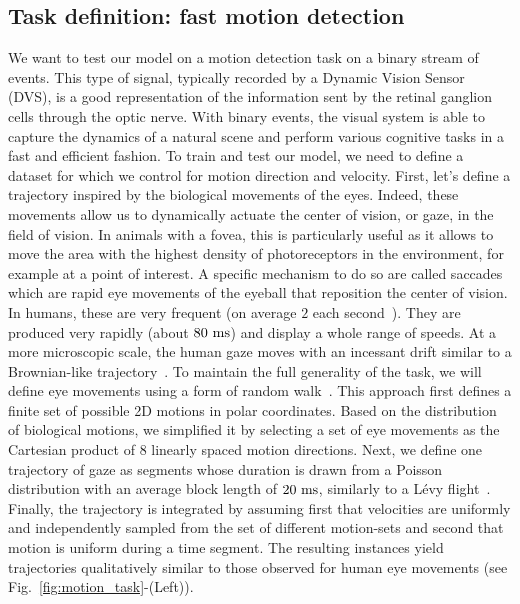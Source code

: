 \documentclass[default]{sn-jnl}%
\theoremstyle{thmstyleone}%
\theoremstyle{thmstyletwo}%
\theoremstyle{thmstylethree}%
\newcommand{\seeFig}[1]{see Fig.~\ref{fig:#1}}%
\begin{document}
\subsection{Task definition: fast motion detection}
We want to test our model on a motion detection task on a binary stream of events. This type of signal, typically recorded by a Dynamic Vision Sensor (DVS), is a good representation of the information sent by the retinal ganglion cells through the optic nerve. With binary events, the visual system is able to capture the dynamics of a natural scene and perform various cognitive tasks in a fast and efficient fashion. To train and test our model, we need to define a dataset for which we control for motion direction and velocity. 
First, let's define a trajectory inspired by the biological movements of the eyes. Indeed, these movements allow us to dynamically actuate the center of vision, or gaze, in the field of vision. In animals with a fovea, this is particularly useful as it allows to move the area with the highest density of photoreceptors in the environment, for example at a point of interest. A specific mechanism to do so are called saccades which are rapid eye movements of the eyeball that reposition the center of vision. In humans, these are very frequent (on average $2$ each second~\citep{dandekar_neural_2012}). They are produced very rapidly (about $80~\si{\milli\second}$) and display a whole range of speeds. At a more microscopic scale, the human gaze moves with an incessant drift similar to a Brownian-like trajectory~\citep{poletti_head-eye_2015}. To maintain the full generality of the task, we will define eye movements using a form of random walk~\citep{engbert_integrated_2011}. This approach first defines a finite set of possible 2D motions in polar coordinates. Based on the distribution of biological motions, we simplified it by selecting a set of eye movements as the Cartesian product of %
$8$ linearly spaced motion directions. Next, we define one trajectory of gaze as segments whose duration is drawn from a Poisson distribution with an average block length of $20~\si{\milli\second}$, similarly to a Lévy flight~\citep[p. 289]{mandelbrot_fractal_1982}. Finally, the trajectory is integrated by assuming first that velocities are uniformly and independently sampled from the set of different motion-sets and second that motion is uniform during a time segment. The resulting instances yield trajectories qualitatively similar to those observed for human eye movements (\seeFig{motion_task}-(Left)). 
\end{document}
